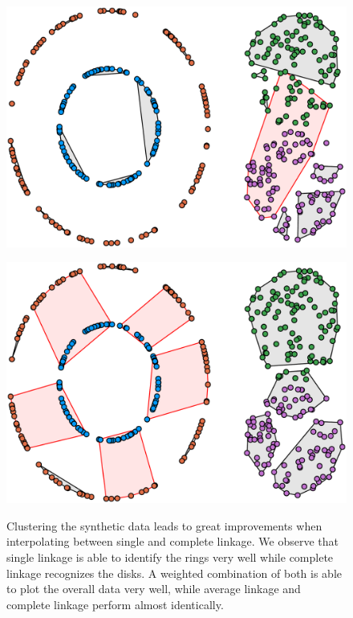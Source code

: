 \begin{figure}[H]
\begin{minipage}{.45\textwidth}
\end{minipage}
\begin{minipage}{.45\textwidth}
  \centering
  {\includegraphics[width=\linewidth]{plots/single_linkage_370}}
\end{minipage}\qquad
\begin{minipage}{.45\textwidth}
  \centering
  {\includegraphics[width=\linewidth]{plots/complete_linkage_389}}
\end{minipage}
\caption{%
  Clustering the synthetic data leads to great improvements when interpolating between single and complete linkage. We observe that single linkage is able to identify the rings very well while complete linkage recognizes the disks. A weighted combination of both is able to plot the overall data very well, while average linkage and complete linkage perform almost identically.
  }
\label{fig:syntheticexperiments}
\end{figure}

